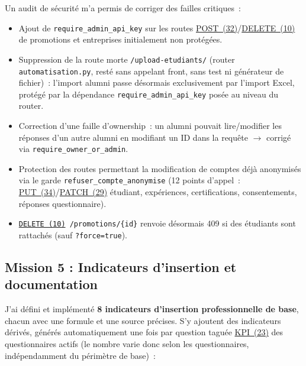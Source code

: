 \documentclass[12pt,a4paper]{report}
\begin{document}
Un audit de sécurité m'a permis de corriger des failles critiques~:

\begin{itemize}
  \item Ajout de \texttt{require\_admin\_api\_key} sur les routes \hyperlink{abbr-POST}{POST~(32)}/\hyperlink{abbr-DELETE}{DELETE~(10)} de promotions et entreprises initialement non protégées.
  \item Suppression de la route morte \texttt{/upload-etudiants/} (router \texttt{automatisation.py}, resté sans appelant front, sans test ni générateur de fichier)~: l'import alumni passe désormais exclusivement par l'import Excel, protégé par la dépendance \texttt{require\_admin\_api\_key} posée au niveau du router.
  \item Correction d'une faille d'ownership~: un alumni pouvait lire/modifier les réponses d'un autre alumni en modifiant un ID dans la requête $\rightarrow$ corrigé via \texttt{require\_owner\_or\_admin}.
  \item Protection des routes permettant la modification de comptes déjà anonymisés via le garde \texttt{refuser\_compte\_anonymise} (12 points d'appel~: \hyperlink{abbr-PUT}{PUT~(34)}/\hyperlink{abbr-PATCH}{PATCH~(29)} étudiant, expériences, certifications, consentements, réponses questionnaire).
  \item \texttt{\hyperlink{abbr-DELETE}{DELETE~(10)} /promotions/\{id\}} renvoie désormais 409 si des étudiants sont rattachés (sauf \texttt{?force=true}).
\end{itemize}

\subsection{Mission 5 : Indicateurs d'insertion et documentation}

J'ai défini et implémenté \textbf{8 indicateurs d'insertion professionnelle de base}, chacun avec une formule et une source précises. S'y ajoutent des indicateurs dérivés, générés automatiquement une fois par question taguée \hyperlink{abbr-KPI}{KPI~(23)} des questionnaires actifs (le nombre varie donc selon les questionnaires, indépendamment du périmètre de base)~:
\end{document}
